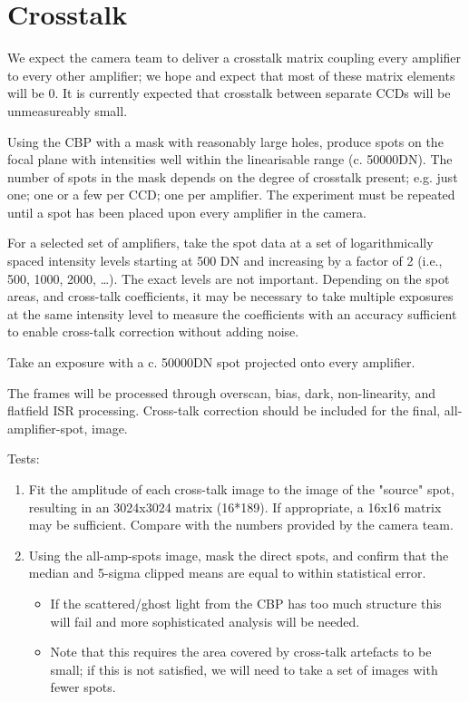 \documentclass[DM,authoryear,toc,lsstdraft]{lsstdoc}
\begin{document}
\section{Crosstalk}

We expect the camera team to deliver a crosstalk matrix coupling every amplifier to every other amplifier; we
hope and expect that most of these matrix elements will be 0.  It is currently expected that crosstalk between
separate CCDs will be unmeasureably small.

Using the CBP with a mask with reasonably large holes, produce spots on the focal plane with intensities well
within the linearisable range (c. 50000DN).  The number of spots in the mask depends on the degree of
crosstalk present; e.g. just one; one or a few per CCD; one per amplifier.  The experiment must be repeated
until a spot has been placed upon every amplifier in the camera.

For a selected set of amplifiers, take the spot data at a set of logarithmically spaced intensity levels
starting at 500 DN and increasing by a factor of 2 (i.e., 500, 1000, 2000, \ldots{}).  The exact levels are not
important.  Depending on the spot areas, and cross-talk coefficients, it may be necessary to take multiple
exposures at the same intensity level to measure the coefficients with an accuracy sufficient to enable
cross-talk correction without adding noise.

Take an exposure with a c. 50000DN spot projected onto every amplifier.

The frames will be processed through overscan, bias, dark, non-linearity, and flatfield ISR
processing. Cross-talk correction should be included for the final, all-amplifier-spot, image.

Tests:
\begin{enumerate}
\item Fit the amplitude of each cross-talk image to the image of the "source" spot, resulting in an 3024x3024
matrix (16*189).  If appropriate, a 16x16 matrix may be sufficient.  Compare with the numbers provided by
the camera team.
\item Using the all-amp-spots image, mask the direct spots, and confirm that the median and 5-sigma clipped means
are equal to within statistical error.
\begin{itemize}
\item If the scattered/ghost light from the CBP has too much structure this will fail and more sophisticated
analysis will be needed.
\item Note that this requires the area covered by cross-talk artefacts to be small; if this is not satisfied, we
will need to take a set of images with fewer spots.
\end{itemize}
\end{enumerate}
\end{document}
